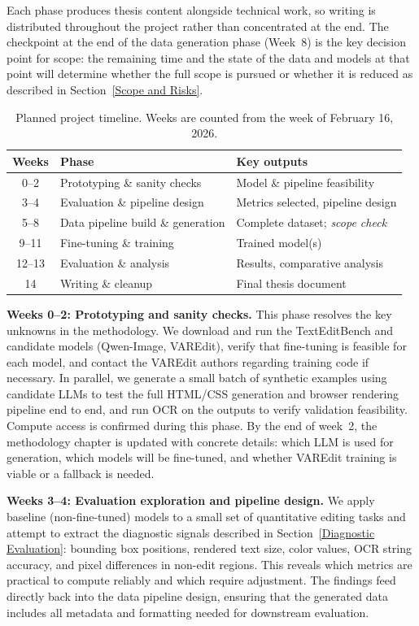 Each phase produces thesis content alongside technical work, so writing is distributed throughout the project rather than concentrated at the end. The checkpoint at the end of the data generation phase (Week~8) is the key decision point for scope: the remaining time and the state of the data and models at that point will determine whether the full scope is pursued or whether it is reduced as described in Section~\ref{Scope and Risks}.


\begin{table}[H]
\centering
\caption{Planned project timeline. Weeks are counted from the week of February 16, 2026.}
\label{tab:schedule}
\begin{tabular}{cll}
\hline
\textbf{Weeks} & \textbf{Phase} & \textbf{Key outputs} \\
\hline
0--2  & Prototyping \& sanity checks & Model \& pipeline feasibility \\
3--4  & Evaluation \& pipeline design & Metrics selected, pipeline design \\
5--8  & Data pipeline build \& generation & Complete dataset; \textit{scope check} \\
9--11 & Fine-tuning \& training & Trained model(s) \\
12--13 & Evaluation \& analysis & Results, comparative analysis \\
14    & Writing \& cleanup & Final thesis document \\
\hline
\end{tabular}
\end{table}


\textbf{Weeks 0--2: Prototyping and sanity checks.} This phase resolves the key unknowns in the methodology. We download and run the TextEditBench and candidate models (Qwen-Image, VAREdit), verify that fine-tuning is feasible for each model, and contact the VAREdit authors regarding training code if necessary. In parallel, we generate a small batch of synthetic examples using candidate LLMs to test the full HTML/CSS generation and browser rendering pipeline end to end, and run OCR on the outputs to verify validation feasibility. Compute access is confirmed during this phase. By the end of week~2, the methodology chapter is updated with concrete details: which LLM is used for generation, which models will be fine-tuned, and whether VAREdit training is viable or a fallback is needed.

\textbf{Weeks 3--4: Evaluation exploration and pipeline design.} We apply baseline (non-fine-tuned) models to a small set of quantitative editing tasks and attempt to extract the diagnostic signals described in Section~\ref{Diagnostic Evaluation}: bounding box positions, rendered text size, color values, OCR string accuracy, and pixel differences in non-edit regions. This reveals which metrics are practical to compute reliably and which require adjustment. The findings feed directly back into the data pipeline design, ensuring that the generated data includes all metadata and formatting needed for downstream evaluation.

